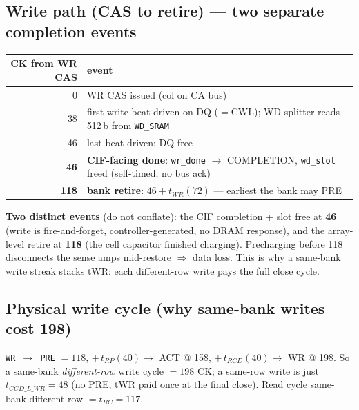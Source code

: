\documentclass[10pt]{article}
\newcommand{\p}[1]{\texttt{#1}}
\begin{document}
\subsection{Write path (CAS to retire) --- two separate completion events}
\begin{center}\small
\begin{tabular}{@{}r l@{}}
\toprule
\textbf{CK from WR CAS} & \textbf{event} \\
\midrule
0    & WR CAS issued (col on CA bus) \\
38   & first write beat driven on DQ ($=$CWL); WD splitter reads 512\,b from \p{WD\_SRAM} \\
46   & last beat driven; DQ free \\
\textbf{46} & \textbf{CIF-facing done}: \p{wr\_done} $\rightarrow$ COMPLETION, \p{wd\_slot} freed (self-timed, no bus ack) \\
\textbf{118}& \textbf{bank retire}: $46+t_{WR}(72)$ --- earliest the bank may PRE \\
\bottomrule
\end{tabular}
\end{center}
\textbf{Two distinct events} (do not conflate): the CIF completion + slot free at \textbf{46}
(write is fire-and-forget, controller-generated, no DRAM response), and the array-level retire at
\textbf{118} (the cell capacitor finished charging). Precharging before 118 disconnects the sense
amps mid-restore $\Rightarrow$ data loss. This is why a same-bank write streak stacks tWR: each
different-row write pays the full close cycle.

\subsection{Physical write cycle (why same-bank writes cost 198)}
\p{WR $\rightarrow$ PRE} $=118$, $+\,t_{RP}(40)\rightarrow$ ACT @ 158, $+\,t_{RCD}(40)\rightarrow$
WR @ 198. So a same-bank \emph{different-row} write cycle $=198$ CK; a same-row write is just
$t_{CCD\_L\_WR}=48$ (no PRE, tWR paid once at the final close). Read cycle same-bank different-row
$= t_{RC}=117$.
\end{document}
